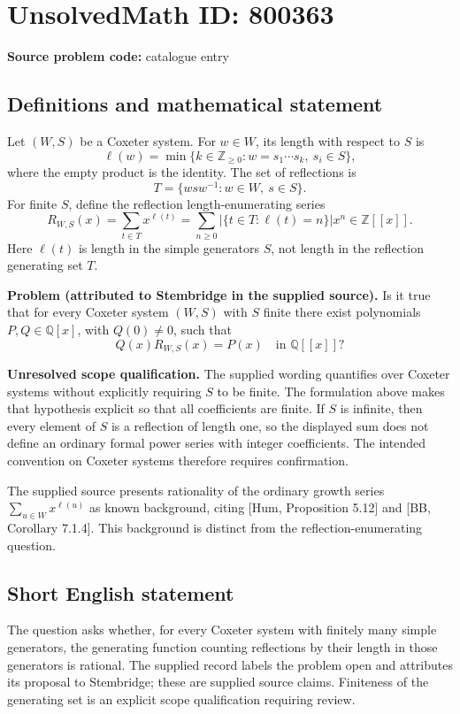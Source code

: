 \documentclass[11pt]{article}
\newcommand{\Z}{\mathbb{Z}}
\newcommand{\Q}{\mathbb{Q}}
\begin{document}
\section*{UnsolvedMath ID: 800363}
\textbf{Source problem code:} catalogue entry
\subsection{Definitions and mathematical statement}
Let \((W,S)\) be a Coxeter system. For \(w\in W\), its length with respect to \(S\) is
\[
\ell(w)=\min\{k\in\Z_{\geq 0}:w=s_1\cdots s_k,\ s_i\in S\},
\]
where the empty product is the identity. The set of reflections is
\[
T=\{wsw^{-1}:w\in W,\ s\in S\}.
\]
For finite \(S\), define the reflection length-enumerating series
\[
R_{W,S}(x)=\sum_{t\in T}x^{\ell(t)}=\sum_{n\geq 0}\bigl|\{t\in T:\ell(t)=n\}\bigr|x^n\in\Z[[x]].
\]
Here \(\ell(t)\) is length in the simple generators \(S\), not length in the reflection generating set \(T\).

\textbf{Problem (attributed to Stembridge in the supplied source).} Is it true that for every Coxeter system \((W,S)\) with \(S\) finite there exist polynomials \(P,Q\in\Q[x]\), with \(Q(0)\ne 0\), such that
\[
Q(x)R_{W,S}(x)=P(x)
\quad\text{in }\Q[[x]]?
\]

\textbf{Unresolved scope qualification.} The supplied wording quantifies over Coxeter systems without explicitly requiring \(S\) to be finite. The formulation above makes that hypothesis explicit so that all coefficients are finite. If \(S\) is infinite, then every element of \(S\) is a reflection of length one, so the displayed sum does not define an ordinary formal power series with integer coefficients. The intended convention on Coxeter systems therefore requires confirmation.

The supplied source presents rationality of the ordinary growth series \(\sum_{u\in W}x^{\ell(u)}\) as known background, citing [Hum, Proposition 5.12] and [BB, Corollary 7.1.4]. This background is distinct from the reflection-enumerating question.
\subsection{Short English statement}
The question asks whether, for every Coxeter system with finitely many simple generators, the generating function counting reflections by their length in those generators is rational. The supplied record labels the problem open and attributes its proposal to Stembridge; these are supplied source claims. Finiteness of the generating set is an explicit scope qualification requiring review.
\end{document}
